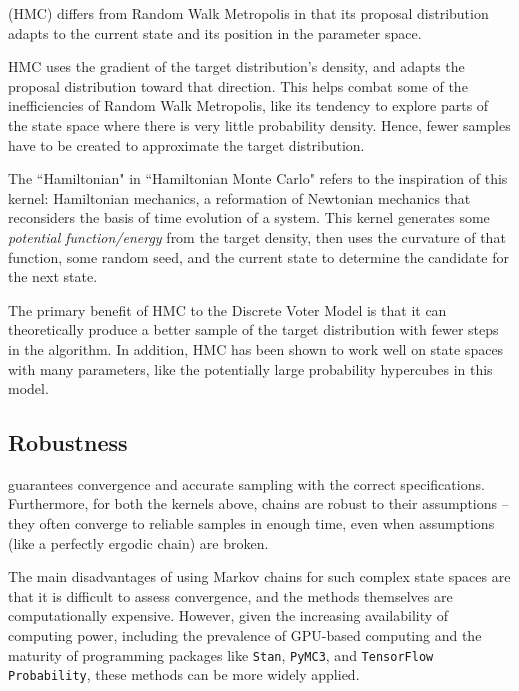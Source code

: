  (HMC) differs from Random Walk Metropolis in that its proposal distribution adapts to the current state and its position in the parameter space.\cite{hmc_theory}

HMC uses the gradient of the target distribution's density, and adapts the proposal distribution toward that direction. This helps combat some of the inefficiencies of Random Walk Metropolis, like its tendency to explore parts of the state space where there is very little probability density. Hence, fewer samples have to be created to approximate the target distribution.

The ``Hamiltonian" in ``Hamiltonian Monte Carlo" refers to the inspiration of this kernel: Hamiltonian mechanics, a reformation of Newtonian mechanics that reconsiders the basis of time evolution of a system.\cite{hamiltonian} This kernel generates some \textit{potential function/energy} from the target density, then uses the curvature of that function, some random seed, and the current state to determine the candidate for the next state.\cite{mcmc_hmc}

The primary benefit of HMC to the Discrete Voter Model is that it can theoretically produce a better sample of the target distribution with fewer steps in the algorithm. In addition, HMC has been shown to work well on state spaces with many parameters, like the potentially large probability hypercubes in this model.\cite{mcmc_hmc}

\subsection{Robustness}

 guarantees convergence and accurate sampling with the correct specifications.\cite{mcmc_history} Furthermore, for both the kernels above, chains are robust to their assumptions -- they often converge to reliable samples in enough time, even when assumptions (like a perfectly ergodic chain) are broken.

The main disadvantages of using Markov chains for such complex state spaces are that it is difficult to assess convergence, and the methods themselves are computationally expensive. However, given the increasing availability of computing power, including the prevalence of GPU-based computing and the maturity of programming packages like \texttt{Stan}, \texttt{PyMC3}, and \texttt{TensorFlow Probability}, these methods can be more widely applied.
